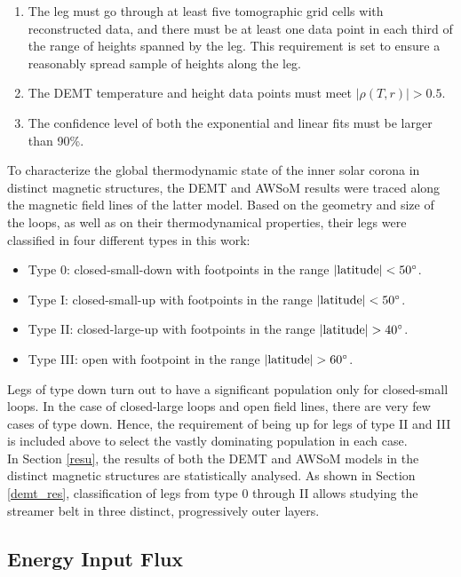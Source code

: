\documentclass[namedreferences]{solarphysics}
\newcommand{\mdeg}{^\circ}
\newcommand{\rhoTr}{\rho(T,r)}
\begin{document}
\begin{article}
\begin{enumerate}
\item 
The leg must go through at least five tomographic grid cells with reconstructed data, and there must be at least one data point in each third of the range of heights spanned by the leg. {This requirement is set to ensure a reasonably spread sample of heights along the leg.}
\item 
The {DEMT temperature and height data points must meet} $|\rhoTr| > 0.5$.
\item 
{The confidence level of both the exponential and linear fits must be larger than 90\%.} 
\end{enumerate}

{To characterize the global thermodynamic state of the inner solar corona in distinct magnetic structures, the DEMT and AWSoM results were traced along the magnetic field lines of the latter model. Based on the geometry and size of the loops, as well as on their thermodynamical properties, their legs were classified in four different types in this work:} 

\begin{itemize}
\item Type 0: closed-small-down with footpoints in the range $|{\rm latitude}|<50\mdeg$. 
\item Type I: closed-small-up with footpoints in the range $|{\rm latitude}|<50\mdeg$. 
\item Type II: closed-large-up with footpoints in the range $|{\rm latitude}|>40\mdeg$. 
\item Type III: open with footpoint in the range $|{\rm latitude}|>60\mdeg$.
\end{itemize}

{Legs of type down turn out to have a significant population only for closed-small loops. In the case of closed-large loops and open field lines, there are very few cases of type down. Hence, the requirement of being up for legs of type II and III is included above to select the vastly dominating population in each case}. \\
In Section \ref{resu}, the results of both the DEMT and AWSoM models in the distinct magnetic structures are statistically analysed. {As shown in Section \ref{demt_res}, classification of legs from type 0 through II allows studying the streamer belt in three distinct, progressively outer layers.}

\subsection{{Energy Input Flux}}\label{energia} 


\end{article}
\end{document}
